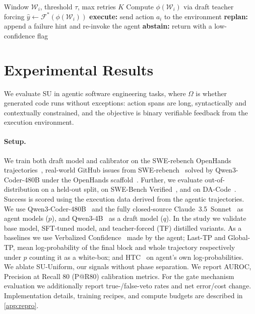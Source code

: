 \documentclass[11pt]{article}
\begin{document}
\begin{algorithm}[t]
\caption{SU Veto-Gate Policy}
\label{alg:veto}
\begin{algorithmic}[1]
  \Require Window $\mathcal{W}_i$, threshold $\tau$, max retries $K$
  \State Compute $\phi(\mathcal{W}_i)$ via draft teacher forcing 
  \State $\hat{y} \leftarrow \mathcal{F}^*(\phi(\mathcal{W}_i))$ 
    \State \textbf{execute:} send action $a_i$ to the environment
    \State \textbf{replan:} append a failure hint and re-invoke the agent
  \Else
    \State \textbf{abstain:} return with a low-confidence flag
  \EndIf
\end{algorithmic}
\end{algorithm}

\section{Experimental Results}
\label{sec:experiments}

We evaluate SU in agentic software engineering tasks, where $\Omega$ is whether generated code runs without exceptions: action spans are long, syntactically and contextually constrained, and the objective is binary verifiable feedback from the execution environment.

\paragraph{Setup.}
We train both draft model and calibrator on the SWE-rebench OpenHands
trajectories~\citep{trofimova2025openhandstrajs}, real-world GitHub issues
from SWE-rebench~\citep{badertdinov2026swe} solved by Qwen3-Coder-480B under the
OpenHands scaffold~\citep{wang2025openhands}. Further, we evaluate out-of-distribution on a
held-out split, on SWE-Bench
Verified~\citep{jimenez2024swebench}, and on DA-Code~\citep{dacode}.
Success is scored using the execution data derived from the agentic trajectories. We use
Qwen3-Coder-480B~\citep{qwen3coder} and the fully closed-source Claude~3.5~Sonnet~\citep{claude35} as agent models ($p$), and Qwen3-4B~\citep{yang2025qwen3} as a draft model ($q$). In the study we validate base model, SFT-tuned model, and teacher-forced (TF) distilled variants.
As a baselines we use Verbalized Confidence~\citep{tian2023just} made by the agent; Last-TP and
Global-TP, mean log-probability of the final block and whole trajectory respectively under $p$ counting it as a
white-box; and HTC~\citep{zhang2025htc} on agent's own log-probabilities. We ablate SU-Uniform, our signals without phase separation. We report
AUROC, Precision at Recall 80 (P@R80) calibration metrics. For the gate mechanism evaluation we additionally report true-/false-veto rates and net
error/cost change. Implementation details, training recipes, and compute budgets are described in
\autoref{app:repro}.
\end{document}
